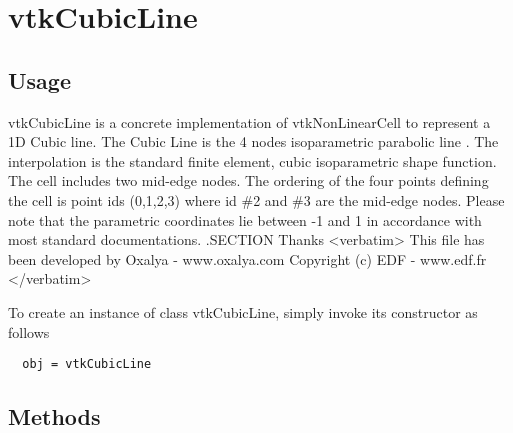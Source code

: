 \section{vtkCubicLine}

\subsection{Usage}

 vtkCubicLine is a concrete implementation of vtkNonLinearCell to represent a 1D Cubic line.
 The Cubic Line is the 4 nodes isoparametric parabolic line . The
 interpolation is the standard finite element, cubic isoparametric
 shape function. The cell includes two mid-edge nodes. The ordering of the
 four points defining the cell is point ids (0,1,2,3) where id \#2 and \#3 are the
 mid-edge nodes. Please note that the parametric coordinates lie between -1 and 1 
 in accordance with most standard documentations.
 .SECTION Thanks 
 <verbatim> 
 This file has been developed by Oxalya - www.oxalya.com 
 Copyright (c) EDF - www.edf.fr 
 </verbatim> 

To create an instance of class vtkCubicLine, simply
invoke its constructor as follows
\begin{verbatim}
  obj = vtkCubicLine
\end{verbatim}
\subsection{Methods}

